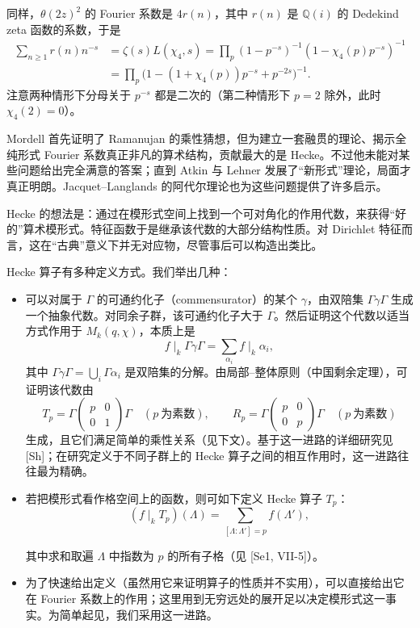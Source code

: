 同样，$\theta(2z)^{2}$ 的 Fourier 系数是 $4r(n)$，其中 $r(n)$ 是 $\mathbb{Q}(i)$ 的 Dedekind zeta 函数的系数，于是
\begin{equation}\tag{5.2}\label{c3:eq:5.2}
\begin{aligned}
\sum_{n\ge1}r(n)n^{-s}&=\zeta(s)L(\chi_{4},s)=\prod_{p}(1-p^{-s})^{-1}(1-\chi_{4}(p)p^{-s})^{-1}\\
&=\prod_{p}\bigl(1-(1+\chi_{4}(p))p^{-s}+p^{-2s}\bigr)^{-1}.
\end{aligned}
\end{equation}
注意两种情形下分母关于 $p^{-s}$ 都是二次的（第二种情形下 $p=2$ 除外，此时 $\chi_{4}(2)=0$）。

Mordell 首先证明了 Ramanujan 的乘性猜想，但为建立一套融贯的理论、揭示全纯形式 Fourier 系数真正非凡的算术结构，贡献最大的是 Hecke。不过他未能对某些问题给出完全满意的答案；直到 Atkin 与 Lehner 发展了“新形式”理论，局面才真正明朗。Jacquet--Langlands 的阿代尔理论也为这些问题提供了许多启示。

Hecke 的想法是：通过在模形式空间上找到一个可对角化的作用代数，来获得“好的”算术模形式。特征函数于是继承该代数的大部分结构性质。对 Dirichlet 特征而言，这在“古典”意义下并无对应物，尽管事后可以构造出类比。

Hecke 算子有多种定义方式。我们举出几种：
\begin{itemize}[leftmargin=2em]
\item 可以对属于 $\Gamma$ 的可通约化子（commensurator）的某个 $\gamma$，由双陪集 $\Gamma\gamma\Gamma$ 生成一个抽象代数。对同余子群，该可通约化子大于 $\Gamma$。然后证明这个代数以适当方式作用于 $M_{k}(q,\chi)$，本质上是
\[
f\mid_{k}\Gamma\gamma\Gamma=\sum_{\alpha_{i}}f\mid_{k}\alpha_{i},
\]
其中 $\Gamma\gamma\Gamma=\bigcup_{i}\Gamma\alpha_{i}$ 是双陪集的分解。由局部--整体原则（中国剩余定理），可证明该代数由
\[
T_{p}=\Gamma\begin{pmatrix}p&0\\0&1\end{pmatrix}\Gamma\quad(p\ \text{为素数}),\qquad
R_{p}=\Gamma\begin{pmatrix}p&0\\0&p\end{pmatrix}\Gamma\quad(p\ \text{为素数})
\]
生成，且它们满足简单的乘性关系（见下文）。基于这一进路的详细研究见 [Sh]；在研究定义于不同子群上的 Hecke 算子之间的相互作用时，这一进路往往最为精确。
\item 若把模形式看作格空间上的函数，则可如下定义 Hecke 算子 $T_{p}$：
\[
(f\mid_{k}T_{p})(\Lambda)=\sum_{[\Lambda:\Lambda']=p}f(\Lambda'),
\]

其中求和取遍 $\Lambda$ 中指数为 $p$ 的所有子格（见 [Se1, VII-5]）。
\item 为了快速给出定义（虽然用它来证明算子的性质并不实用），可以直接给出它在 Fourier 系数上的作用；这里用到无穷远处的展开足以决定模形式这一事实。为简单起见，我们采用这一进路。
\end{itemize}

